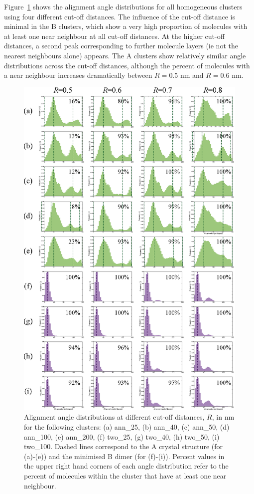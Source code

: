 Figure~\ref{figSI:alignmentangles_cutoffs} shows the alignment angle distributions for all homogeneous clusters using four different cut-off distances.  The influence of the cut-off distance is minimal in the B clusters, which show a very high proportion of molecules with at least one near neighbour at all cut-off distances.  At the higher cut-off distances, a second peak corresponding to further molecule layers (ie not the nearest neighbours alone) appears.  The A clusters show relatively similar angle distributions across the cut-off distances, although the percent of molecules with a near neighbour increases dramatically between $R=0.5$ nm and $R=0.6$ nm.  
%
\begin{figure}[!tbh]
\centering
\includegraphics[width=0.85\linewidth]{Figures/AlignmentAnglesCutoffAssessment_SI.eps}
\caption{Alignment angle distributions at different cut-off distances, $R$, in nm for the following clusters: (a) ann\_25, (b) ann\_40, (c) ann\_50, (d) ann\_100, (e) ann\_200, (f) two\_25, (g) two\_40, (h) two\_50, (i) two\_100. Dashed lines correspond to the A crystal structure (for (a)-(e)) and the minimised B dimer (for (f)-(i)). Percent values in the upper right hand corners of each angle distribution refer to the percent of molecules within the cluster that have at least one near neighbour.}
\label{figSI:alignmentangles_cutoffs}
\end{figure}
%

